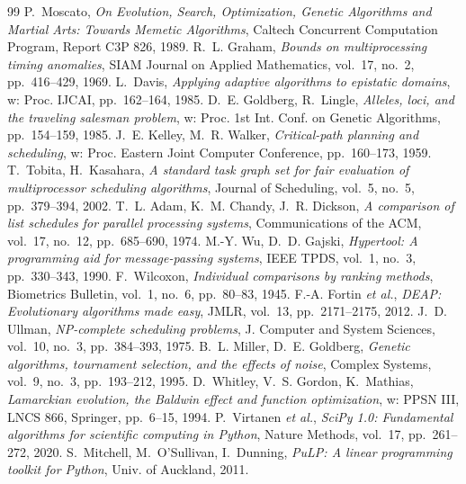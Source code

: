 \documentclass[12pt,a4paper]{article}
\begin{document}
\newpage
\begin{thebibliography}{99}
 P.~Moscato, \textit{On Evolution, Search, Optimization, Genetic Algorithms and Martial Arts: Towards Memetic Algorithms}, Caltech Concurrent Computation Program, Report C3P 826, 1989.
 R.~L. Graham, \textit{Bounds on multiprocessing timing anomalies}, SIAM Journal on Applied Mathematics, vol.~17, no.~2, pp.~416--429, 1969.
 L.~Davis, \textit{Applying adaptive algorithms to epistatic domains}, w: Proc. IJCAI, pp.~162--164, 1985.
 D.~E. Goldberg, R.~Lingle, \textit{Alleles, loci, and the traveling salesman problem}, w: Proc. 1st Int. Conf. on Genetic Algorithms, pp.~154--159, 1985.
 J.~E. Kelley, M.~R. Walker, \textit{Critical-path planning and scheduling}, w: Proc. Eastern Joint Computer Conference, pp.~160--173, 1959.
 T.~Tobita, H.~Kasahara, \textit{A standard task graph set for fair evaluation of multiprocessor scheduling algorithms}, Journal of Scheduling, vol.~5, no.~5, pp.~379--394, 2002.
 T.~L. Adam, K.~M. Chandy, J.~R. Dickson, \textit{A comparison of list schedules for parallel processing systems}, Communications of the ACM, vol.~17, no.~12, pp.~685--690, 1974.
 M.-Y. Wu, D.~D. Gajski, \textit{Hypertool: A programming aid for message-passing systems}, IEEE TPDS, vol.~1, no.~3, pp.~330--343, 1990.
 F.~Wilcoxon, \textit{Individual comparisons by ranking methods}, Biometrics Bulletin, vol.~1, no.~6, pp.~80--83, 1945.
 F.-A. Fortin \textit{et al.}, \textit{DEAP: Evolutionary algorithms made easy}, JMLR, vol.~13, pp.~2171--2175, 2012.
 J.~D. Ullman, \textit{NP-complete scheduling problems}, J. Computer and System Sciences, vol.~10, no.~3, pp.~384--393, 1975.
 B.~L. Miller, D.~E. Goldberg, \textit{Genetic algorithms, tournament selection, and the effects of noise}, Complex Systems, vol.~9, no.~3, pp.~193--212, 1995.
 D.~Whitley, V.~S. Gordon, K.~Mathias, \textit{Lamarckian evolution, the Baldwin effect and function optimization}, w: PPSN III, LNCS 866, Springer, pp.~6--15, 1994.
 P.~Virtanen \textit{et al.}, \textit{SciPy 1.0: Fundamental algorithms for scientific computing in Python}, Nature Methods, vol.~17, pp.~261--272, 2020.
 S.~Mitchell, M.~O'Sullivan, I.~Dunning, \textit{PuLP: A linear programming toolkit for Python}, Univ. of Auckland, 2011.

\end{thebibliography}
\end{document}
